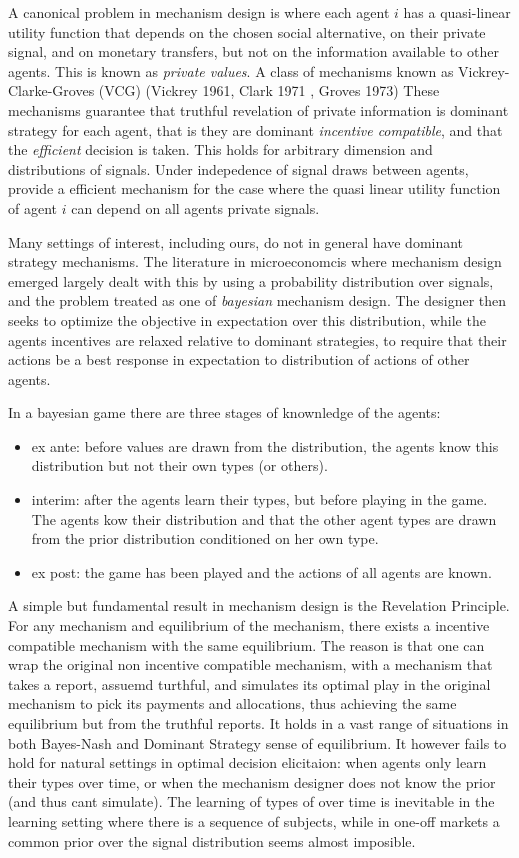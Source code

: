 A canonical problem in mechanism design is where each agent $i$ has a quasi-linear utility function that depends on the chosen social alternative, on their private signal, and on monetary transfers, but not on the information available to other agents.
This is known as \emph{private values}.
A class of mechanisms known as Vickrey-Clarke-Groves (VCG)  (Vickrey 1961, Clark 1971 , Groves 1973)
These mechanisms guarantee that truthful revelation of private information is dominant strategy for each agent, that is they are dominant \emph{incentive compatible}, and that the \emph{efficient} decision is taken. 
This holds for arbitrary dimension and distributions of signals.
Under indepedence of signal draws between agents, \cite{jehiel2001efficient} provide a efficient mechanism for the case where the quasi linear utility function of agent $i$ can depend on all agents private signals. 

Many settings of interest, including ours, do not in general have dominant strategy mechanisms. 
The literature in microeconomcis where mechanism design emerged largely dealt with this by using a probability distribution over signals, and the problem treated as one of  \emph{bayesian} mechanism design.
The designer then seeks to optimize the objective in expectation over this distribution, while the agents incentives are relaxed relative to dominant strategies, to require that their actions be a best response in expectation to distribution of actions of other agents.

In a bayesian game there are three stages of knownledge of the agents:
\begin{itemize}
 \item ex ante: before values are drawn from the distribution, the agents know this distribution but not their own types (or others). 
 \item interim: after the agents learn their types, but before playing in the game. The agents kow their distribution and that the other agent types are drawn from the prior distribution conditioned on her own type.
 \item ex post: the game has been played and the actions of all agents are known.
\end{itemize}

A simple but fundamental result in mechanism design is the Revelation Principle.
For any mechanism and equilibrium of the mechanism, there exists a incentive compatible mechanism with the same equilibrium.
The reason is that one can wrap the original non incentive compatible mechanism, with a mechanism that takes a report, assuemd turthful, and simulates its optimal play in the original mechanism to pick its payments and allocations, thus achieving the same equilibrium but from the truthful reports. 
It holds in a vast range of situations in both Bayes-Nash and Dominant Strategy sense of equilibrium. 
It however fails to hold for natural settings in optimal decision elicitaion: when agents only
 learn their types over time, or when the mechanism designer does not know the prior (and thus cant simulate).
The learning of types of over time is inevitable in the learning setting where there is a sequence of subjects, while in one-off markets a common prior over the signal distribution seems almost imposible.


